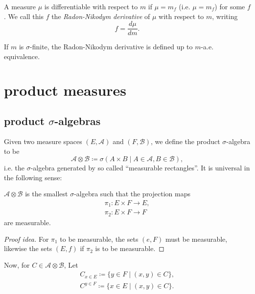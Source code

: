 \documentclass[12pt]{article}
\begin{document}
\begin{definition}
	A measure $\mu$ is differentiable with respect to $m$ if $\mu=m_f$ (i.e. $\mu=m_f$) for some $f$. We call this $f$ the \emph{Radon-Nikodym derivative} of $\mu$ with respect to $m$, writing 
	\begin{equation*}
		f=\frac{d\mu}{dm}.
	\end{equation*}
\end{definition}

\begin{remark}[]
	If $m$ is $\sigma$-finite, the Radon-Nikodym derivative is defined up to $m$-a.e. equivalence.
\end{remark}


\section{product measures} %


\subsection{product $\sigma$-algebras} %

Given two measure spaces $(E,\mathcal{A})$ and $(F,\mathcal{B})$, we define the product $\sigma$-algebra to be 
\begin{equation*}
	\mathcal{A}\otimes\mathcal{B}\coloneqq\sigma(A\times B\mid A\in\mathcal{A}, B\in\mathcal{B}),
\end{equation*}
i.e. the $\sigma$-algebra generated by so called ``measurable rectangles''. It is universal in the following sense:

\begin{proposition}[]
	$\mathcal{A}\otimes\mathcal{B}$ is the smallest $\sigma$-algebra such that the projection maps 
	\begin{gather*}
		\pi_1:E\times F\to E, \\
		\pi_2: E\times F\to F
	\end{gather*}
	are measurable.
\end{proposition}
\begin{proof}[Proof idea]
	For $\pi_1$ to be measurable, the sets $(e,F)$ must be measurable, likewise the sets $(E,f)$ if $\pi_2$ is to be measurable. 
\end{proof}

Now, for $C\in\mathcal{A}\otimes\mathcal{B}$, Let
\begin{gather*}
	C_{x\in E}\coloneqq \{y\in F\mid (x,y)\in C\}, \\
	C^{y\in F}\coloneqq \{x\in E\mid (x,y)\in C\}.
\end{gather*}
\end{document}
